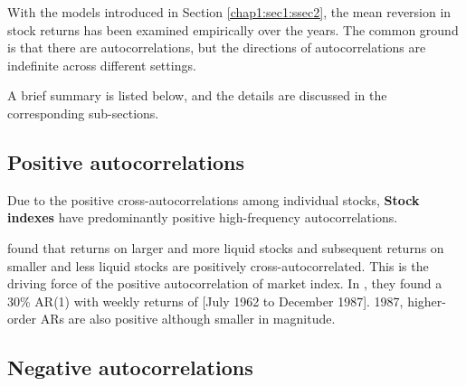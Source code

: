 With the models introduced in Section \ref{chap1:sec1:ssec2}, the mean reversion in stock returns
has been examined empirically over the years. The common ground is that there are autocorrelations,
but the directions of autocorrelations are indefinite across different settings.

A brief summary is listed below, and the details are discussed in the corresponding sub-sections.

\subsection{Positive autocorrelations}
Due to the positive cross-autocorrelations among individual stocks, \textbf{Stock indexes} have predominantly
positive high-frequency autocorrelations.

\citet{lo1988stock,lo1990contrarian} found that returns on larger and more liquid stocks and subsequent
returns on smaller and less liquid stocks are positively cross-autocorrelated. This is the driving force of 
the positive autocorrelation of market index. In \citeyear{lo1988stock}, they found a 30\% AR(1) with weekly returns
of [July 1962 to December 1987]. 1987, higher-order ARs
are also positive although smaller in magnitude.


\subsection{Negative autocorrelations}

